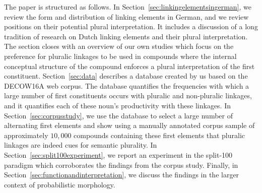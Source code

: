 The paper is structured as follows.
In Section~\ref{sec:linkingelementsingerman}, we review the form and distribution of linking elements in German, and we review positions on their potential plural interpretation.
It includes a discussion of a long tradition of research on Dutch linking elements and their plural interpretation.
The section closes with an overview of our own studies which focus on the preference for pluralic linkages to be used in compounds where the internal conceptual structure of the compound enforces a plural interpretation of the first constituent.
Section~\ref{sec:data} describes a database created by us based on the DECOW16A web corpus.
The database quantifies the frequencies with which a large number of first constituents occurs with pluralic and non-pluralic linkages, and it quantifies each of these noun's productivity with these linkages.
In Section~\ref{sec:corpusstudy}, we use the database to select a large number of alternating first elements and show using a manually annotated corpus sample of approximately $10,000$ compounds containing these first elements that pluralic linkages are indeed cues for semantic plurality.
In Section~\ref{sec:split100experiment}, we report an experiment in the split-100 paradigm which corroborates the findings from the corpus study.
Finally, in Section~\ref{sec:functionandinterpretation}, we discuss the findings in the larger context of probabilistic morphology.

